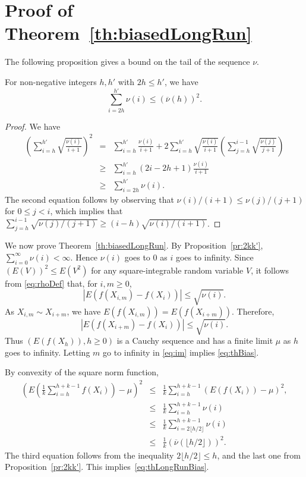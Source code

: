 \documentclass[a4paper,11pt]{article}
\begin{document}
\section{Proof of Theorem~\ref{th:biasedLongRun}}
The following proposition gives a bound on the tail of the sequence \(\nu\).\begin{proposition}\label{pr:2kk'}For non-negative integers \(h,h'\) with \(2h\leq h'\),
we have \begin{equation*}
\sum^{h'}_{i=2h}\nu(i)\leq (\overline{\nu}(h))^{2}.
\end{equation*}  
\end{proposition}
\begin{proof}
We have
\begin{eqnarray*}\left(\sum_{i=h}^{h'}\sqrt{\frac{\nu(i)}{i+1}}\right)^{2}&=&\sum_{i=h}^{h'}\frac{\nu(i)}{i+1}+2\sum_{i=h}^{h'}\sqrt{\frac{\nu(i)}{i+1}}\left(\sum_{j=h}^{i-1}\sqrt{\frac{\nu(j)}{j+1}}\right)
\\&\ge&\sum_{i=h}^{h'}(2i-2h+1)\frac{\nu(i)}{i+1}\\
&\ge&\sum^{h'}_{i=2h}\nu(i).
\end{eqnarray*}
The second equation follows by observing that \(\nu(i)/(i+1)\le\nu(j)/(j+1)\) for \(0\leq j<i\), which implies that \(\sum_{j=h}^{i-1}\sqrt{{\nu(j)}/(j+1)}\ge(i-h)\sqrt{\nu(i)/(i+1)}\). 
\end{proof}
  

We now prove Theorem~\ref{th:biasedLongRun}. By Proposition~\ref{pr:2kk'},   \(\sum^{\infty}_{i=0}\nu(i)<\infty\). Hence \(\nu(i)\) goes to \(0\) as \(i\) goes to infinity. Since \((E(V))^{2}\leq E(V^{2})\) for any square-integrable random variable \(V\),  it follows from \eqref{eq:rhoDef} that, for \(i,m\geq0\),\begin{equation*}
|E(f(X_{i,m})-f(X_{i}))|\leq\sqrt{\nu(i)}.
\end{equation*}As  \(X_{i,m}\sim X_{i+m}\), we have \(E(f(X_{i,m}))=E(f(X_{i+m}))\). Therefore, \begin{equation}\label{eq:im}
|E(f(X_{i+m})-f(X_{i}))|\leq\sqrt{\nu(i)}.
\end{equation} Thus \((E(f(X_{h})),h\ge0)\) is a Cauchy sequence and  has a finite limit \(\mu\) as \(h\) goes to infinity.   
Letting \(m\) go to infinity in \eqref{eq:im}  implies \eqref{eq:thBias}.

By convexity of the square norm function,\begin{eqnarray*}(E(\frac{1}{k}\sum^{h+k-1}_{i=h}f(X_{i}))-\mu)^{2}&\leq& \frac{1}{k}\sum^{h+k-1}_{i=h}(E(f(X_{i}))-\mu)^{2},\\
&\le& \frac{1}{k}\sum^{h+k-1}_{i=h}\nu(i)\\
&\le& \frac{1}{k}\sum^{h+k-1}_{i=2\lfloor h/2\rfloor}\nu(i)\\&\le&\frac{1}{k}(\overline{\nu}(\lfloor h/2\rfloor))^{2}.
\end{eqnarray*} The third equation follows from the inequality \(2\lfloor h/2\rfloor\le h\), and the last one from Proposition~\ref{pr:2kk'}. This implies~\eqref{eq:thLongRunBias}.
\end{document}
